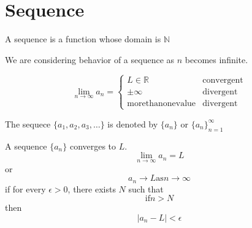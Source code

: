 \chapter{Sequence}

\begin{definition}[Sequence]
  A sequence is a function whose domain is \(\mathbb{N}\)
\end{definition}

We are considering behavior of a sequence as \(n\) becomes infinite.

\[
  \lim_{n \to \infty} a_n = \begin{cases}
    L \in \mathbb{R} & \text{convergent} \\
    \pm \infty & \text{divergent} \\
    \mathrm{more than one value} & \text{divergent}
  \end{cases}
\]

\begin{definition}
  The sequece \(\{a_1, a_2, a_3, \dots\}\) is denoted by \(\{a_n\}\) or \(\{a_n\}_{n=1}^{\infty}\)
\end{definition}

\begin{theorem}
  A sequence \(\{a_n\}\) converges to \(L\).
  \[
    \lim_{n \to \infty} a_n = L
  \]
  or
  \[
    a_n \to L \mathrm{ as } n \to \infty
  \]
  if for every \(\epsilon > 0\), there exists \(N\) such that
  \[
    \mathrm{if } n > N 
  \]
  then
  \[
    |a_n - L| < \epsilon
  \]
\end{theorem}